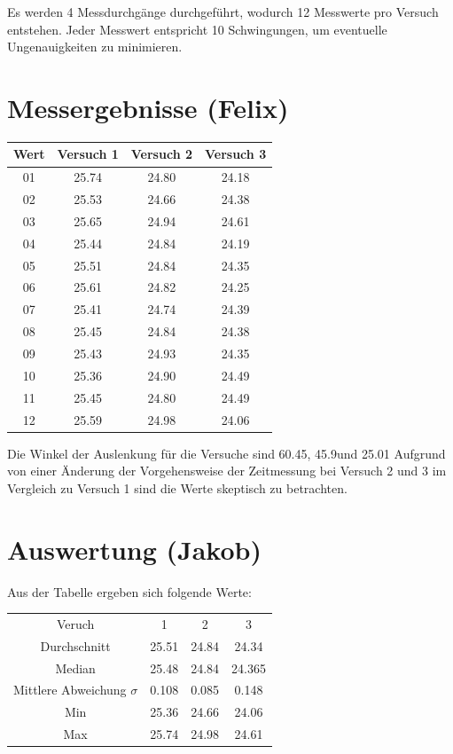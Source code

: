 \documentclass[8pt, letterpaper]{article}
\begin{document}
Es werden 4 Messdurchgänge durchgeführt, wodurch 12 Messwerte pro Versuch entstehen.
Jeder Messwert entspricht 10 Schwingungen, um eventuelle Ungenauigkeiten zu minimieren.

\section{Messergebnisse (Felix)}
\begin{center}
  \begin{tabular} { c|c|c|c }
    Wert & Versuch 1 & Versuch 2 & Versuch 3 \\
    \hline
    01 & 25.74 & 24.80 & 24.18 \\
    02 & 25.53 & 24.66 & 24.38 \\
    03 & 25.65 & 24.94 & 24.61 \\
    04 & 25.44 & 24.84 & 24.19 \\
    05 & 25.51 & 24.84 & 24.35 \\
    06 & 25.61 & 24.82 & 24.25 \\
    07 & 25.41 & 24.74 & 24.39 \\
    08 & 25.45 & 24.84 & 24.38 \\
    09 & 25.43 & 24.93 & 24.35 \\
    10 & 25.36 & 24.90 & 24.49 \\
    11 & 25.45 & 24.80 & 24.49 \\
    12 & 25.59 & 24.98 & 24.06
  \end{tabular}
\end{center}

Die Winkel der Auslenkung für die Versuche sind 60.45\degree, 45.9\degree und 25.01\degree
Aufgrund von einer Änderung der Vorgehensweise der Zeitmessung bei Versuch 2 und 3 im Vergleich zu Versuch 1 sind die Werte skeptisch zu betrachten.

\section{Auswertung (Jakob)}
Aus der Tabelle ergeben sich folgende Werte:
\begin{center}
  \begin{tabular} { c|c|c|c }
    Veruch & 1 & 2 & 3 \\
    Durchschnitt & 25.51 & 24.84 & 24.34 \\
    Median & 25.48 & 24.84 & 24.365 \\
    Mittlere Abweichung $\sigma$ & 0.108 & 0.085 & 0.148 \\
    Min & 25.36 & 24.66 & 24.06 \\
    Max & 25.74 & 24.98 & 24.61
  \end{tabular}
\end{center}
\end{document}
